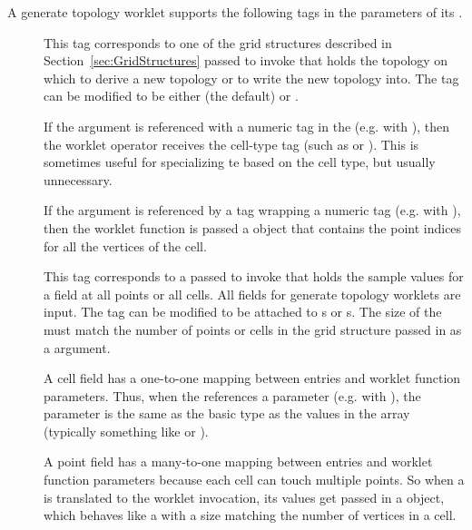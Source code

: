 A generate topology worklet supports the following tags in the parameters
of its \controlsignature.
\begin{description}
\item[] This tag corresponds to one of the grid structures
  described in Section~\ref{sec:GridStructures} passed to invoke that holds
  the topology on which to derive a new topology or to write the new
  topology into. The  tag can be modified to be either
   (the default) or .

  If the  argument is referenced with a numeric tag in the
  \executionsignature (e.g. with ), then the worklet operator
  receives the cell-type tag (such as  or
  ). This is sometimes useful for specializing te  based
  on the cell type, but usually unnecessary.

  If the  argument is referenced by a 
  tag wrapping a numeric tag (e.g. with ), then
  the worklet function is passed a  object that
  contains the point indices for all the vertices of the cell.
\item[] This tag corresponds to a 
  passed to invoke that holds the sample values for a field at all points
  or all cells. All fields for generate topology worklets are input. The
   tag can be modified to be attached to s or
  s. The size of the  must match the
  number of points or cells in the grid structure passed in as a
   argument.

  A cell field has a one-to-one mapping between 
  entries and worklet function parameters. Thus, when the
  \executionsignature references a \controlsignature {}
  parameter (e.g. with ), the parameter is the same as the
  basic type as the values in the array (typically something like
   or ).

  A point field has a many-to-one mapping between 
  entries and worklet function parameters because each cell can touch
  multiple points. So when a  is translated to the
  worklet invocation, its values get passed in a 
  object, which behaves like a  with a size matching the number
  of vertices in a cell.
\end{description}

